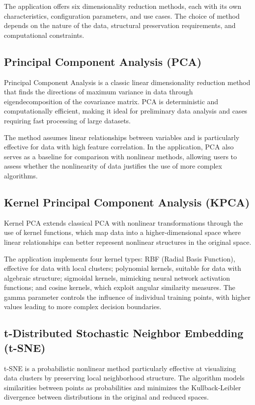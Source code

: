 \documentclass[a4paper, 12pt]{article}
\begin{document}
The application offers six dimensionality reduction methods, each with its own characteristics, configuration parameters, and use cases. The choice of method depends on the nature of the data, structural preservation requirements, and computational constraints.

\subsection{Principal Component Analysis (PCA)}

Principal Component Analysis is a classic linear dimensionality reduction method that finds the directions of maximum variance in data through eigendecomposition of the covariance matrix. PCA is deterministic and computationally efficient, making it ideal for preliminary data analysis and cases requiring fast processing of large datasets.

The method assumes linear relationships between variables and is particularly effective for data with high feature correlation. In the application, PCA also serves as a baseline for comparison with nonlinear methods, allowing users to assess whether the nonlinearity of data justifies the use of more complex algorithms.

\subsection{Kernel Principal Component Analysis (KPCA)}

Kernel PCA extends classical PCA with nonlinear transformations through the use of kernel functions, which map data into a higher-dimensional space where linear relationships can better represent nonlinear structures in the original space.

The application implements four kernel types: RBF (Radial Basis Function), effective for data with local clusters; polynomial kernels, suitable for data with algebraic structure; sigmoidal kernels, mimicking neural network activation functions; and cosine kernels, which exploit angular similarity measures. The gamma parameter controls the influence of individual training points, with higher values leading to more complex decision boundaries.

\subsection{t-Distributed Stochastic Neighbor Embedding (t-SNE)}

t-SNE is a probabilistic nonlinear method particularly effective at visualizing data clusters by preserving local neighborhood structure. The algorithm models similarities between points as probabilities and minimizes the Kullback-Leibler divergence between distributions in the original and reduced spaces.
\end{document}
